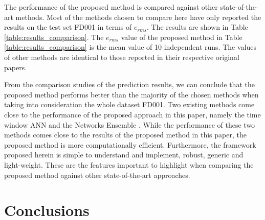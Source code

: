 \documentclass[12pt]{IEEEtran}%
\begin{document}



The performance of the proposed method is compared against
other state-of-the-art methods. Most of the methods chosen to compare here 
have only reported the results on the test set FD001 in terms of
$e_{rms}$. The results are shown in Table \ref{table:results_comparison}. The
$e_{rms}$ value of the proposed method in Table \ref{table:results_comparison}
is the mean value of 10 independent runs. The values of other methods are
identical to those reported in their respective original papers.

From the comparison studies of the prediction results, we can conclude that
the proposed method performs better than the majority of the chosen methods
when taking into consideration the whole dataset FD001. Two existing methods
come close to the performance of the proposed approach in this paper, namely
the time window ANN \cite{Lim2016} and the Networks Ensemble \cite{Zhang2016}.
While the performance of these two methods comes close to the results of the
proposed method in this paper, the proposed method is more computationally
efficient. Furthermore, the framework proposed herein is simple to understand
and implement, robust, generic and light-weight. These are the features 
important to highlight when comparing the proposed method against other
state-of-the-art approaches.

\section{Conclusions}
\end{document}
